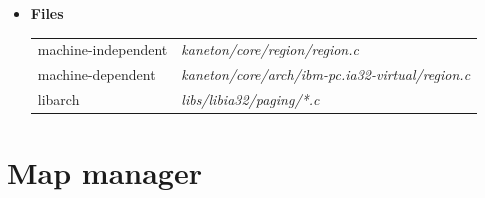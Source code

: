 \begin{itemize}
  \item {\bf Files}\\

    \begin{tabular}{| l | l |}
      \hline
      machine-independent & {\em kaneton/core/region/region.c}\\
      machine-dependent & {\em kaneton/core/arch/ibm-pc.ia32-virtual/region.c}\\
      libarch & {\em libs/libia32/paging/*.c}\\\hline
    \end{tabular}

\end{itemize}

%
%

\newpage

\section{Map manager}

